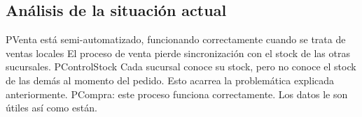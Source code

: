 \subsection{Análisis de la situación actual}

\begin{analisisSituacionActual}
  \analisisActualItem
    {PVenta está semi-automatizado, funcionando correctamente cuando se trata
     de ventas locales}
    {El proceso de venta pierde sincronización con el stock de las otras
     sucursales.}
  \analisisActualItem
    {PControlStock}
    {Cada sucursal conoce su stock, pero no conoce el stock de las demás al
     momento del pedido. Esto acarrea la problemática explicada anteriormente.}
  \analisisActualItem
    {PCompra: este proceso funciona correctamente.}
    {Los datos le son útiles así como están.}
\end{analisisSituacionActual}

